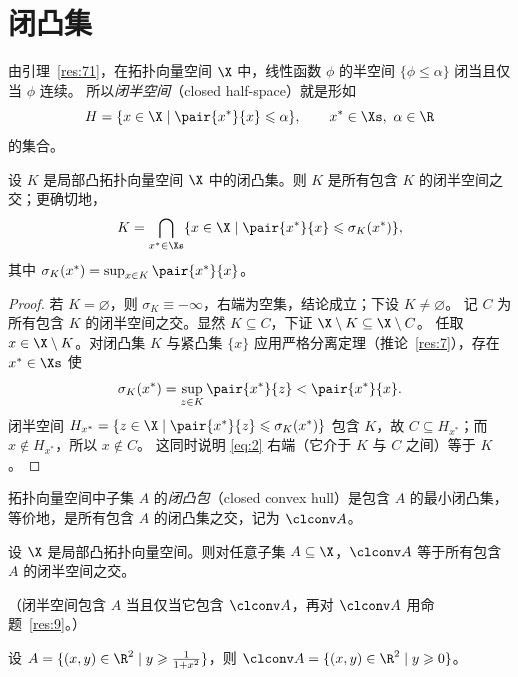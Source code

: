 \section{闭凸集}

由引理~\ref{res:71}，在拓扑向量空间 $\X$ 中，线性函数 $\phi$ 的半空间 $\{\phi\leqslant\alpha\}$ 闭当且仅当 $\phi$ 连续。
所以\emph{闭半空间}（closed half-space）就是形如
\[
  H=\{x\in\X\mid\pair{x^*}{x}\leqslant\alpha\},\qquad x^*\in\Xs,\ \alpha\in\R
\]
的集合。

\begin{proposition}
\label{res:9}
设 $K$ 是局部凸拓扑向量空间 $\X$ 中的闭凸集。则 $K$ 是所有包含 $K$ 的闭半空间之交；更确切地，
\begin{equation}
  \label{eq:2}
  K=\bigcap_{x^*\in\Xs}\{x\in\X\mid\pair{x^*}{x}\leqslant\sigma_K(x^*)\},
\end{equation}
其中 $\sigma_K(x^*)=\sup_{x\in K}\pair{x^*}{x}$。
\end{proposition}

\begin{proof}
若 $K=\varnothing$，则 $\sigma_K\equiv-\infty$，右端为空集，结论成立；下设 $K\neq\varnothing$。
记 $C$ 为所有包含 $K$ 的闭半空间之交。显然 $K\subseteq C$，下证 $\X\setminus K\subseteq\X\setminus C$。
任取 $x\in\X\setminus K$。对闭凸集 $K$ 与紧凸集 $\{x\}$ 应用严格分离定理（推论~\ref{res:7}），存在 $x^*\in\Xs$ 使
\[
  \sigma_K(x^*)=\sup_{z\in K}\pair{x^*}{z}<\pair{x^*}{x}.
\]
闭半空间 $H_{x^*}=\{z\in\X\mid\pair{x^*}{z}\leqslant\sigma_K(x^*)\}$ 包含 $K$，故 $C\subseteq H_{x^*}$；而 $x\notin H_{x^*}$，所以 $x\notin C$。
这同时说明 \eqref{eq:2} 右端（它介于 $K$ 与 $C$ 之间）等于 $K$。
\end{proof}

\begin{definition}[闭凸包]
\label{def:7}
拓扑向量空间中子集 $A$ 的\emph{闭凸包}（closed convex hull）是包含 $A$ 的最小闭凸集，等价地，是所有包含 $A$ 的闭凸集之交，记为 $\clconv A$。
\end{definition}

\begin{corollary}
\label{res:10}
设 $\X$ 是局部凸拓扑向量空间。则对任意子集 $A\subseteq\X$，$\clconv A$ 等于所有包含 $A$ 的闭半空间之交。
\end{corollary}

（闭半空间包含 $A$ 当且仅当它包含 $\clconv A$，再对 $\clconv A$ 用命题~\ref{res:9}。）

\begin{example}
\label{exa:2}
设 $A=\{(x,y)\in\R^2\mid y\geqslant\frac1{1+x^2}\}$，则 $\clconv A=\{(x,y)\in\R^2\mid y\geqslant0\}$。
\end{example}


